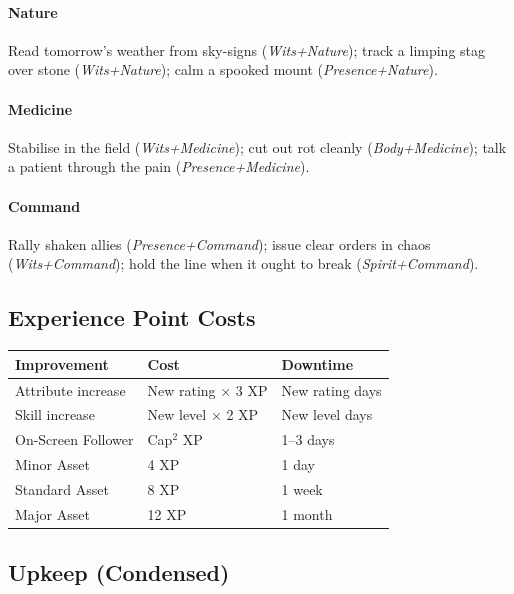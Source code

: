\paragraph{Nature}
Read tomorrow's weather from sky-signs (\emph{Wits+Nature}); track a limping stag over stone (\emph{Wits+Nature}); calm a spooked mount (\emph{Presence+Nature}).

\paragraph{Medicine}
Stabilise in the field (\emph{Wits+Medicine}); cut out rot cleanly (\emph{Body+Medicine}); talk a patient through the pain (\emph{Presence+Medicine}).

\paragraph{Command}
Rally shaken allies (\emph{Presence+Command}); issue clear orders in chaos (\emph{Wits+Command}); hold the line when it ought to break (\emph{Spirit+Command}).

\subsection{Experience Point Costs}\label{subsec:xp_costs_ref}

\begin{center}
\feTableStart
\begin{tabularx}{\linewidth}{@{}l l l @{}}
\toprule
\textbf{Improvement} & \textbf{Cost} & \textbf{Downtime} \\
\midrule
Attribute increase & New rating $\times$ 3 XP & New rating days \\
Skill increase & New level $\times$ 2 XP & New level days \\
On-Screen Follower & Cap\(^{2}\) XP & 1--3 days \\
Minor Asset & 4 XP & 1 day \\
Standard Asset & 8 XP & 1 week \\
Major Asset & 12 XP & 1 month \\
\bottomrule
\end{tabularx}
\feTableEnd
\end{center}

\subsection{Upkeep (Condensed)}\label{subsec:upkeep_srd}

